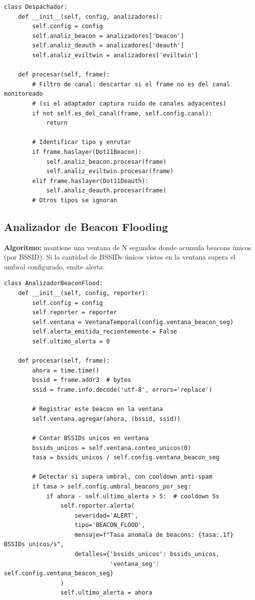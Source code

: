 \documentclass[11pt,a4paper]{article}
\begin{document}
\begin{lstlisting}
class Despachador:
    def __init__(self, config, analizadores):
        self.config = config
        self.analiz_beacon = analizadores['beacon']
        self.analiz_deauth = analizadores['deauth']
        self.analiz_eviltwin = analizadores['eviltwin']

    def procesar(self, frame):
        # Filtro de canal: descartar si el frame no es del canal monitoreado
        # (si el adaptador captura ruido de canales adyacentes)
        if not self.es_del_canal(frame, self.config.canal):
            return

        # Identificar tipo y enrutar
        if frame.haslayer(Dot11Beacon):
            self.analiz_beacon.procesar(frame)
            self.analiz_eviltwin.procesar(frame)
        elif frame.haslayer(Dot11Deauth):
            self.analiz_deauth.procesar(frame)
        # Otros tipos se ignoran
\end{lstlisting}

\subsection{Analizador de Beacon Flooding}

\textbf{Algoritmo:} mantiene una ventana de N segundos donde acumula
beacons únicos (por BSSID). Si la cantidad de BSSIDs únicos vistos en la
ventana supera el umbral configurado, emite alerta.

\begin{lstlisting}
class AnalizadorBeaconFlood:
    def __init__(self, config, reporter):
        self.config = config
        self.reporter = reporter
        self.ventana = VentanaTemporal(config.ventana_beacon_seg)
        self.alerta_emitida_recientemente = False
        self.ultimo_alerta = 0

    def procesar(self, frame):
        ahora = time.time()
        bssid = frame.addr3  # bytes
        ssid = frame.info.decode('utf-8', errors='replace')

        # Registrar este beacon en la ventana
        self.ventana.agregar(ahora, (bssid, ssid))

        # Contar BSSIDs unicos en ventana
        bssids_unicos = self.ventana.conteo_unicos(0)
        tasa = bssids_unicos / self.config.ventana_beacon_seg

        # Detectar si supera umbral, con cooldown anti-spam
        if tasa > self.config.umbral_beacons_por_seg:
            if ahora - self.ultimo_alerta > 5:  # cooldown 5s
                self.reporter.alerta(
                    severidad='ALERT',
                    tipo='BEACON_FLOOD',
                    mensaje=f"Tasa anomala de beacons: {tasa:.1f} BSSIDs unicos/s",
                    detalles={'bssids_unicos': bssids_unicos,
                              'ventana_seg': self.config.ventana_beacon_seg}
                )
                self.ultimo_alerta = ahora
\end{lstlisting}
\end{document}

